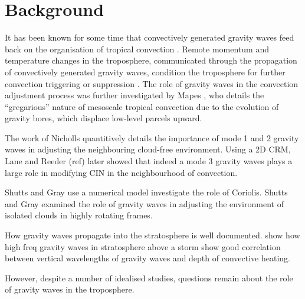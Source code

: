 \documentclass[a4paper,10pt]{article}
\title{}
\author{}
\begin{document}
\maketitle

\begin{abstract}

\end{abstract}
\section{Background}
%
It has been known for some time that convectively generated gravity waves feed back on the
organisation of tropical convection \citep{wheeler1999convectively}. Remote momentum and temperature
changes in the troposphere, communicated through the propagation of convectively generated gravity
waves, condition the troposphere for further convection triggering or suppression
\citep{bretherton1989gravity}. The role of gravity waves in the convection adjustment process
was further investigated by Mapes \citep{mapes1993gregarious}, who details the ``gregarious'' nature
of mesoscale tropical convection due to the evolution of gravity bores, which displace low-level
parcels upward. 

The work of Nicholls quantitively details the importance of mode 1 and 2 gravity waves in adjusting
the neighbouring cloud-free environment. Using a 2D CRM, Lane and Reeder (ref) later showed that
indeed a mode 3 gravity waves plays a large role in modifying CIN in the neighbourhood of
convection. 

Shutts and Gray use a numerical model investigate the role of Coriolis. 
Shutts and Gray examined the role of gravity waves in adjusting the environment of isolated clouds
in highly rotating frames. 

How gravity waves propagate into the stratosphere is well documented.
\citep{alexander1995gravity} show how high freq gravity waves in stratosphere above a storm show
good correlation between vertical wavelengths of gravity waves and depth of convective heating.

However, despite a number of idealised studies, questions remain about the role of gravity
waves in the troposphere. 
\end{document}
